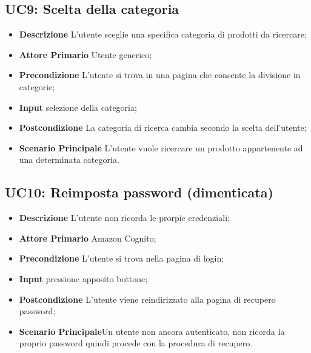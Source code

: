        \subsection{UC9: Scelta della categoria}
        \label{sec:UC9}
        \begin{itemize}
            \item \textbf{Descrizione} L'utente sceglie una specifica categoria di prodotti da ricercare;
            \item \textbf{Attore Primario} Utente generico;
            \item \textbf{Precondizione} L'utente si trova in una pagina che consente la divisione in categorie;
            \item \textbf{Input} selezione della categoria;
            \item \textbf{Postcondizione} La categoria di ricerca cambia secondo la scelta dell'utente;
            \item \textbf{Scenario Principale} L'utente vuole ricercare un prodotto appartenente ad una determinata categoria.
        \end{itemize}
        \subsection{UC10: Reimposta password (dimenticata)}
        \label{sec:UC10}
        \begin{itemize}
            \item \textbf{Descrizione} L'utente non ricorda le prorpie credenziali;
            \item \textbf{Attore Primario} Amazon Cognito;
            \item \textbf{Precondizione} L'utente si trova nella pagina di login;
            \item \textbf{Input} pressione apposito bottone;
            \item \textbf{Postcondizione} L'utente viene reindirizzato alla pagina di recupero password;
            \item \textbf{Scenario Principale}Un utente non ancora autenticato, non ricorda la proprio password quindi procede con la procedura di recupero.
        \end{itemize}
